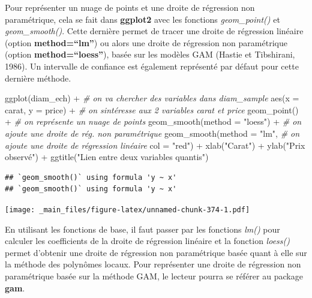 \documentclass[
]{book}
\newenvironment{Shaded}{\begin{snugshade}}{\end{snugshade}}
\newcommand{\AttributeTok}[1]{\textcolor[rgb]{0.77,0.63,0.00}{#1}}
\newcommand{\CommentTok}[1]{\textcolor[rgb]{0.56,0.35,0.01}{\textit{#1}}}
\newcommand{\FunctionTok}[1]{\textcolor[rgb]{0.00,0.00,0.00}{#1}}
\newcommand{\NormalTok}[1]{#1}
\newcommand{\SpecialCharTok}[1]{\textcolor[rgb]{0.00,0.00,0.00}{#1}}
\newcommand{\StringTok}[1]{\textcolor[rgb]{0.31,0.60,0.02}{#1}}
\theoremstyle{definition}
\theoremstyle{definition}
\theoremstyle{definition}
\theoremstyle{definition}
\theoremstyle{remark}
\begin{document}
Pour représenter un nuage de points et une droite de régression non paramétrique, cela se fait dans \textbf{ggplot2} avec les fonctions \emph{geom\_point()} et \emph{geom\_smooth()}. Cette dernière permet de tracer une droite de régression linéaire (option \textbf{method=``lm''}) ou alors une droite de régression non paramétrique (option \textbf{method=``loess''}), basée sur les modèles GAM (Hastie et Tibshirani, 1986). Un intervalle de confiance est également représenté par défaut pour cette dernière méthode.

\begin{Shaded}
\begin{Highlighting}[]
\FunctionTok{ggplot}\NormalTok{(diam\_ech) }\SpecialCharTok{+}                \CommentTok{\# on va chercher des variables dans diam\_sample}
  \FunctionTok{aes}\NormalTok{(}\AttributeTok{x =}\NormalTok{ carat, }\AttributeTok{y =}\NormalTok{ price) }\SpecialCharTok{+}     \CommentTok{\# on s\textquotesingle{}intéresse aux 2 variables carat et price}
  \FunctionTok{geom\_point}\NormalTok{() }\SpecialCharTok{+}                  \CommentTok{\# on représente un nuage de points}
  \FunctionTok{geom\_smooth}\NormalTok{(}\AttributeTok{method =} \StringTok{"loess"}\NormalTok{) }\SpecialCharTok{+} \CommentTok{\# on ajoute une droite de rég. non paramétrique}
  \FunctionTok{geom\_smooth}\NormalTok{(}\AttributeTok{method =} \StringTok{"lm"}\NormalTok{,      }\CommentTok{\# on ajoute une droite de régression linéaire}
              \AttributeTok{col =} \StringTok{"red"}\NormalTok{) }\SpecialCharTok{+} 
  \FunctionTok{xlab}\NormalTok{(}\StringTok{"Carat"}\NormalTok{) }\SpecialCharTok{+}
  \FunctionTok{ylab}\NormalTok{(}\StringTok{"Prix observé"}\NormalTok{) }\SpecialCharTok{+}
  \FunctionTok{ggtitle}\NormalTok{(}\StringTok{"Lien entre deux variables quantis"}\NormalTok{)}
\end{Highlighting}
\end{Shaded}

\begin{verbatim}
## `geom_smooth()` using formula 'y ~ x'
## `geom_smooth()` using formula 'y ~ x'
\end{verbatim}

\texttt{[image: \_main\_files/figure-latex/unnamed-chunk-374-1.pdf]}

En utilisant les fonctions de base, il faut passer par les fonctions \emph{lm()} pour calculer les coefficients de la droite de régression linéaire et la fonction \emph{loess()} permet d'obtenir une droite de régression non paramétrique basée quant à elle sur la méthode des polynômes locaux. Pour représenter une droite de régression non paramétrique basée sur la méthode GAM, le lecteur pourra se référer au package \textbf{gam}.
\end{document}
